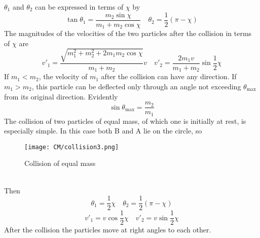 $\theta_1$ and $\theta_2$ can be expressed in terms of $\chi$ by
\[\tan\theta_1 = \frac{m_2\sin\chi}{m_1 + m_2 \cos\chi} \quad \theta_2 = \frac{1}{2}(\pi - \chi)\]
The magnitudes of the velocities of the two particles after the collision in terms of $\chi$ are
\[v'_1 = \frac{\sqrt{m_1^2 + m_2^2 + 2m_1m_2\cos\chi}}{m_1+m_2}v \quad v'_2 = \frac{2m_1v}{m_1+m_2}\sin\frac{1}{2}\chi\]
If $m_1 < m_2$, the velocity of $m_1$ after the collision can have any direction.
If $m_1 > m_2$, this particle can be deflected only through an angle not exceeding $\theta_\mathrm{max}$ from its original direction. Evidently
\[\sin\theta_{\mathrm{max}} = \frac{m_2}{m_1}\]
The collision of two particles of equal mass, of which one is initially at rest, is especially simple. In this case both B and A lie on the circle, so
\begin{figure}[!h]
	\centering
	\texttt{[image: CM/collision3.png]}
	\caption{Collision of equal mass}
\end{figure}\\
Then 
\[\theta_1 = \frac{1}{2}\chi \quad \theta_2 = \frac{1}{2}(\pi-\chi)\]
\[v'_1 = v\cos\frac{1}{2}\chi \quad v'_2 = v\sin\frac{1}{2}\chi\]
After the collision the particles move at right angles to each other.

